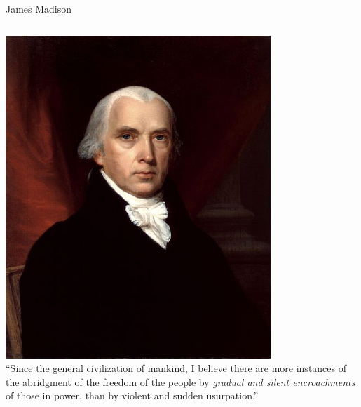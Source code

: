\begin{frame}{James Madison}
    \begin{columns}[onlytextwidth]
            \centering
            \includegraphics[width=0.75\textwidth]{img/madison.jpg} \\
            ``Since the general civilization of mankind, I believe there are more instances of the abridgment of the freedom of the people by \emph{gradual and silent encroachments} of those in power, than by violent and sudden usurpation.''
    \end{columns}
\end{frame}

